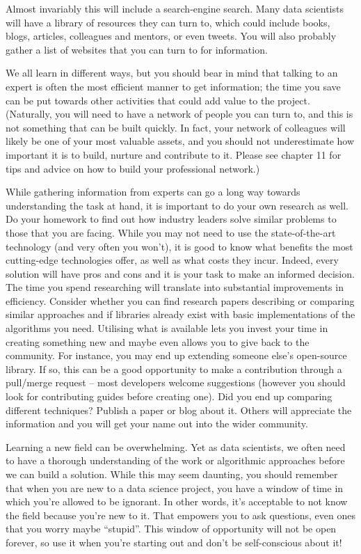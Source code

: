 \documentclass[
]{book}
\begin{document}
Almost invariably this will include a search-engine search. Many data
scientists will have a library of resources they can turn to, which
could include books, blogs, articles, colleagues and mentors, or even
tweets. You will also probably gather a list of websites that you can
turn to for information.

We all learn in different ways, but you should bear in mind that talking
to an expert is often the most efficient manner to get information; the
time you save can be put towards other activities that could add value
to the project. (Naturally, you will need to have a network of people
you can turn to, and this is not something that can be built quickly. In
fact, your network of colleagues will likely be one of your most
valuable assets, and you should not underestimate how important it is to
build, nurture and contribute to it. Please see chapter 11 for tips and
advice on how to build your professional network.)

While gathering information from experts can go a long way towards
understanding the task at hand, it is important to do your own research
as well. Do your homework to find out how industry leaders solve similar
problems to those that you are facing. While you may not need to use the
state-of-the-art technology (and very often you won't), it is good to
know what benefits the most cutting-edge technologies offer, as well as
what costs they incur. Indeed, every solution will have pros and cons
and it is your task to make an informed decision. The time you spend
researching will translate into substantial improvements in efficiency.
Consider whether you can find research papers describing or comparing
similar approaches and if libraries already exist with basic
implementations of the algorithms you need. Utilising what is available
lets you invest your time in creating something new and maybe even
allows you to give back to the community. For instance, you may end up
extending someone else's open-source library. If so, this can be a good
opportunity to make a contribution through a pull/merge request -- most
developers welcome suggestions (however you should look for contributing
guides before creating one). Did you end up comparing different
techniques? Publish a paper or blog about it. Others will appreciate the
information and you will get your name out into the wider community.

Learning a new field can be overwhelming. Yet as data scientists, we
often need to have a thorough understanding of the work or algorithmic
approaches before we can build a solution. While this may seem daunting,
you should remember that when you are new to a data science project, you
have a window of time in which you're allowed to be ignorant. In other
words, it's acceptable to not know the field because you're new to it.
That empowers you to ask questions, even ones that you worry maybe
``stupid''. This window of opportunity will not be open forever, so use
it when you're starting out and don't be self-conscious about it!
\end{document}
